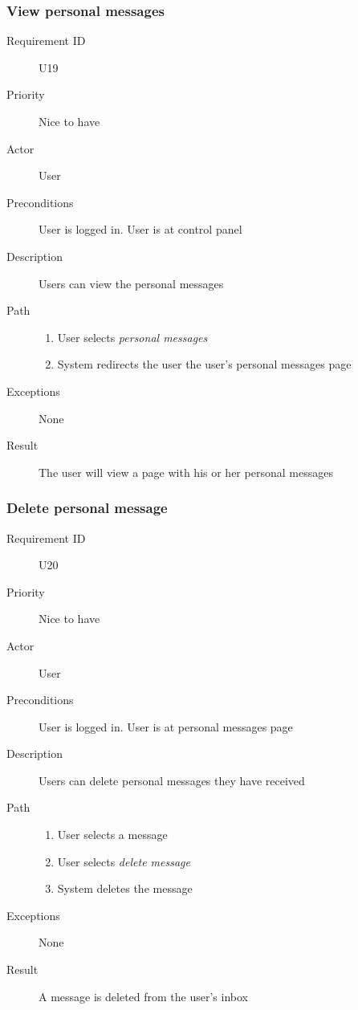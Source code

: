 		\subsubsection{View personal messages}
			\begin{description}
				\item[Requirement ID] U19
				\item[Priority] Nice to have
				\item[Actor] User
				\item[Preconditions] User is logged in. User is at control panel
				\item[Description] Users can view the personal messages
				\item[Path]
 					\begin{enumerate}
						\item User selects \emph{personal messages}
						\item System redirects the user the user's personal messages page
					\end{enumerate}
				\item[Exceptions] None
				\item[Result] The user will view a page with his or her personal messages
			\end{description}
		\subsubsection{Delete personal message}
			\begin{description}
				\item[Requirement ID] U20
				\item[Priority] Nice to have
				\item[Actor] User
				\item[Preconditions] User is logged in. User is at personal messages page
				\item[Description] Users can delete personal messages they have received
				\item[Path]
 					\begin{enumerate}
						\item User selects a message
						\item User selects \emph{delete message}
						\item System deletes the message
					\end{enumerate}
				\item[Exceptions] None
				\item[Result] A message is deleted from the user's inbox
			\end{description}
